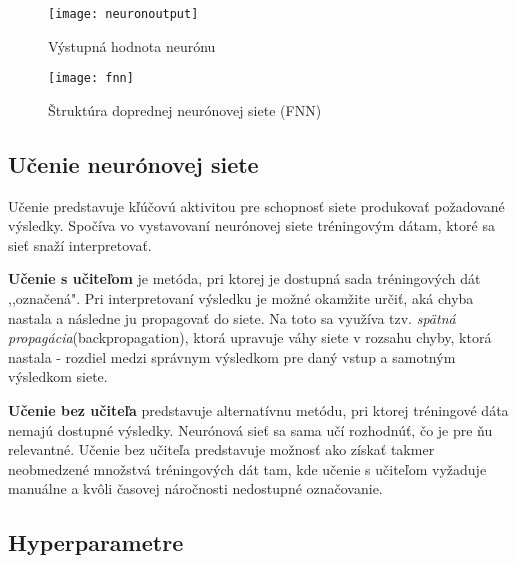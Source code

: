 
\begin{figure}[H]
\begin{center}\texttt{[image: neuronoutput]}\end{center}
\caption[neuronoutput]{Výstupná hodnota neurónu}\label{fig:neuronoutput}
\end{figure}

\noindent


\begin{figure}[H]
\begin{center}\texttt{[image: fnn]}\end{center}
\caption[fnn]{Štruktúra doprednej neurónovej siete (FNN)}\label{fig:fnn}
\end{figure}

\subsection{Učenie neurónovej siete}
\label{analyza_ucenie_nn}

Učenie predstavuje kľúčovú aktivitou pre schopnosť siete produkovať požadované výsledky. Spočíva vo vystavovaní neurónovej siete tréningovým dátam, ktoré sa sieť snaží interpretovať.

\textbf{Učenie s učiteľom} je metóda, pri ktorej je dostupná sada tréningových dát ,,označená". Pri interpretovaní výsledku je možné okamžite určiť, aká chyba nastala a následne ju propagovať do siete. Na toto sa využíva tzv. \textit{spätná propagácia}(backpropagation), ktorá upravuje váhy siete v rozsahu chyby, ktorá nastala - rozdiel medzi správnym výsledkom pre daný vstup a samotným výsledkom siete.
\noindent

\textbf{Učenie bez učiteľa} predstavuje alternatívnu metódu, pri ktorej tréningové dáta nemajú dostupné výsledky. Neurónová sieť sa sama učí rozhodnúť, čo je pre ňu relevantné. Učenie bez učiteľa predstavuje možnosť ako získať takmer neobmedzené množstvá tréningových dát tam, kde učenie s učiteľom vyžaduje manuálne a kvôli časovej náročnosti nedostupné označovanie.
\noindent

\subsection{Hyperparametre}
\label{analyza_hyperparametre}

